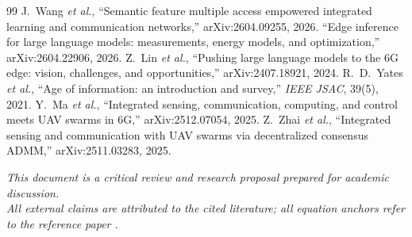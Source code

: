 \documentclass[11pt,a4paper]{article}
\begin{document}
\begin{thebibliography}{99}
 J.~Wang \emph{et al.}, ``Semantic feature multiple access empowered integrated learning and communication networks,'' arXiv:2604.09255, 2026.
 ``Edge inference for large language models: measurements, energy models, and optimization,'' arXiv:2604.22906, 2026.
 Z.~Lin \emph{et al.}, ``Pushing large language models to the 6G edge: vision, challenges, and opportunities,'' arXiv:2407.18921, 2024.
 R.~D.~Yates \emph{et al.}, ``Age of information: an introduction and survey,'' \emph{IEEE JSAC}, 39(5), 2021.
 Y.~Ma \emph{et al.}, ``Integrated sensing, communication, computing, and control meets UAV swarms in 6G,'' arXiv:2512.07054, 2025.
 Z.~Zhai \emph{et al.}, ``Integrated sensing and communication with UAV swarms via decentralized consensus ADMM,'' arXiv:2511.03283, 2025.
\end{thebibliography}

\vspace{0.6em}
\begin{center}\footnotesize\itshape
This document is a critical review and research proposal prepared for academic discussion.\\ All external claims are attributed to the cited literature; all equation anchors refer to the reference paper \cite{refpaper}.
\end{center}
\end{document}
